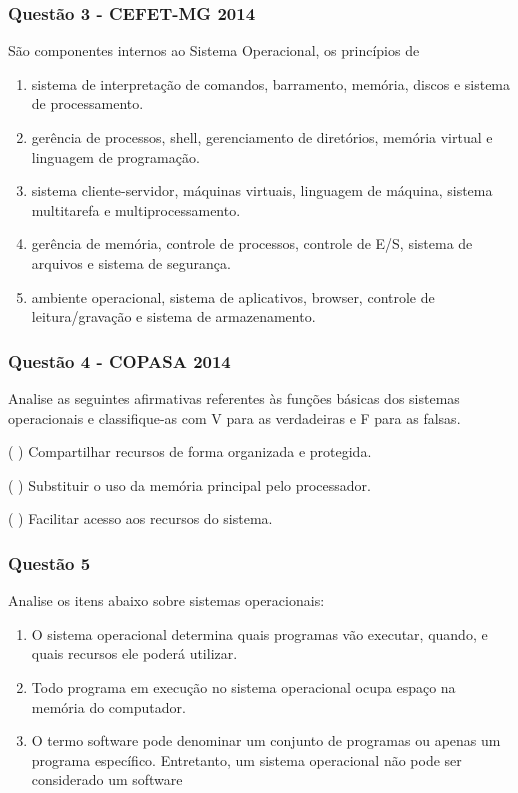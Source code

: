 \documentclass[aspectratio=169,
				xcolor=table]{beamer}
\begin{document}
	\begin{frame}
		\frametitle{Questão 3 - CEFET-MG 2014}
		
		São componentes internos ao Sistema Operacional, os princípios de
		\begin{enumerate}[a]
			\item sistema de interpretação de comandos, barramento, memória, discos e sistema de processamento.

			\item gerência de processos, shell, gerenciamento de diretórios, memória virtual e linguagem de programação.

			\item sistema cliente-servidor, máquinas virtuais, linguagem de máquina, sistema multitarefa e multiprocessamento.

			\item gerência de memória, controle de processos, controle de E/S, sistema de arquivos e sistema de segurança.

			\item ambiente operacional, sistema de aplicativos, browser, controle de leitura/gravação e sistema de armazenamento.

		\end{enumerate}
	\end{frame}
	
	\begin{frame}
		\frametitle{Questão 4 - COPASA 2014}
		Analise as seguintes afirmativas referentes às funções básicas dos sistemas operacionais e classifique-as com V para as verdadeiras e F para as falsas. 

\vspace{1em}

( ) Compartilhar recursos de forma organizada e protegida. 

\vspace{0.6em}
( ) Substituir o uso da memória principal pelo processador. 

\vspace{0.6em}
( ) Facilitar acesso aos recursos do sistema. 

	\end{frame}

	\begin{frame}
		\frametitle{Questão 5}
		Analise os itens abaixo sobre sistemas operacionais:
		\begin{enumerate}[I]
			\item O sistema operacional determina quais programas vão executar, quando, e quais recursos ele poderá utilizar.

			\item Todo programa em execução no sistema operacional ocupa espaço na memória do computador.

			\item O termo software pode denominar um conjunto de programas ou apenas um programa específico. Entretanto, um sistema operacional não pode ser considerado um software
		\end{enumerate}

	\end{frame}
	
\end{document}
